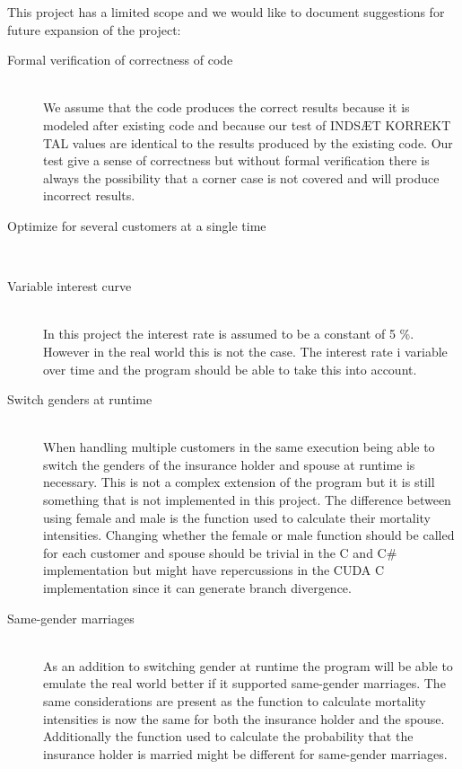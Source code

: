 This project has a limited scope and we would like to document suggestions for future expansion of the project:

\begin{description}
	
\item[Formal verification of correctness of code] \hfill \\
	We assume that the code produces the correct results because it is modeled after existing code and because our test of INDSÆT KORREKT TAL values are identical to the results produced by the existing code. Our test give a sense of correctness but without formal verification there is always the possibility that a corner case is not covered and will produce incorrect results. \\

\item[Optimize for several customers at a single time] \hfill \\

\item[Variable interest curve] \hfill \\
In this project the interest rate is assumed to be a constant of 5 \%. However in the real world this is not the case. The interest rate i variable over time and the program should be able to take this into account. \\


\item[Switch genders at runtime] \hfill \\
When handling multiple customers in the same execution being able to switch the genders of the insurance holder and spouse at runtime is necessary. This is not a complex extension of the program but it is still something that is not implemented in this project. The difference between using female and male is the function used to calculate their mortality intensities. Changing whether the female or male function should be called for each customer and spouse should be trivial in the C and C\# implementation but might have repercussions in the CUDA C implementation since it can generate branch divergence. \\

\item[Same-gender marriages] \hfill \\
As an addition to switching gender at runtime the program will be able to emulate the real world better if it supported same-gender marriages. The same considerations are present as the function to calculate mortality intensities is now the same for both the insurance holder and the spouse. Additionally the function used to calculate the probability that the insurance holder is married might be different for same-gender marriages.

\end{description}
